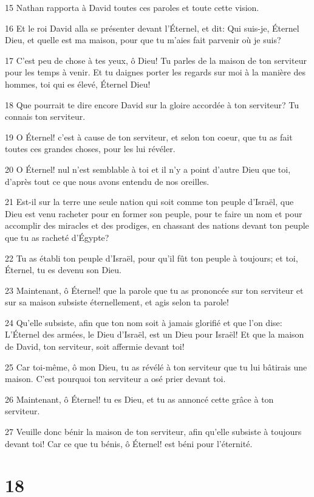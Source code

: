 \par 15 Nathan rapporta à David toutes ces paroles et toute cette vision.
\par 16 Et le roi David alla se présenter devant l'Éternel, et dit: Qui suis-je, Éternel Dieu, et quelle est ma maison, pour que tu m'aies fait parvenir où je suis?
\par 17 C'est peu de chose à tes yeux, ô Dieu! Tu parles de la maison de ton serviteur pour les temps à venir. Et tu daignes porter les regards sur moi à la manière des hommes, toi qui es élevé, Éternel Dieu!
\par 18 Que pourrait te dire encore David sur la gloire accordée à ton serviteur? Tu connais ton serviteur.
\par 19 O Éternel! c'est à cause de ton serviteur, et selon ton coeur, que tu as fait toutes ces grandes choses, pour les lui révéler.
\par 20 O Éternel! nul n'est semblable à toi et il n'y a point d'autre Dieu que toi, d'après tout ce que nous avons entendu de nos oreilles.
\par 21 Est-il sur la terre une seule nation qui soit comme ton peuple d'Israël, que Dieu est venu racheter pour en former son peuple, pour te faire un nom et pour accomplir des miracles et des prodiges, en chassant des nations devant ton peuple que tu as racheté d'Égypte?
\par 22 Tu as établi ton peuple d'Israël, pour qu'il fût ton peuple à toujours; et toi, Éternel, tu es devenu son Dieu.
\par 23 Maintenant, ô Éternel! que la parole que tu as prononcée sur ton serviteur et sur sa maison subsiste éternellement, et agis selon ta parole!
\par 24 Qu'elle subsiste, afin que ton nom soit à jamais glorifié et que l'on dise: L'Éternel des armées, le Dieu d'Israël, est un Dieu pour Israël! Et que la maison de David, ton serviteur, soit affermie devant toi!
\par 25 Car toi-même, ô mon Dieu, tu as révélé à ton serviteur que tu lui bâtirais une maison. C'est pourquoi ton serviteur a osé prier devant toi.
\par 26 Maintenant, ô Éternel! tu es Dieu, et tu as annoncé cette grâce à ton serviteur.
\par 27 Veuille donc bénir la maison de ton serviteur, afin qu'elle subsiste à toujours devant toi! Car ce que tu bénis, ô Éternel! est béni pour l'éternité.

\chapter{18}

